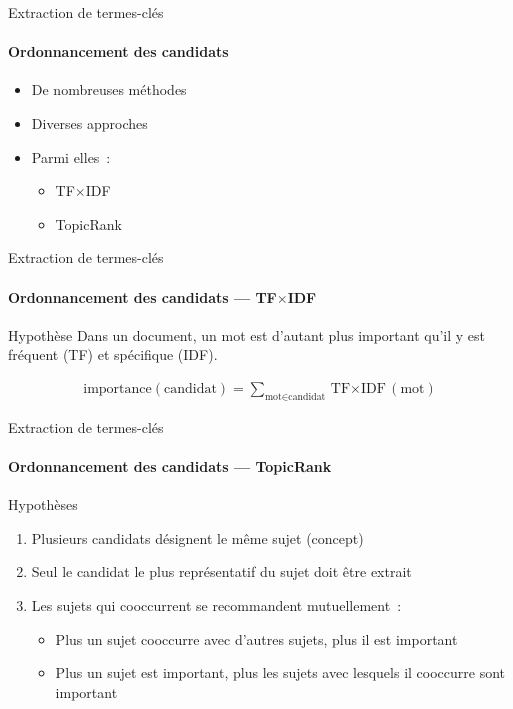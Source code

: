   \begin{frame}{Extraction de termes-clés}
    \framesubtitle{Ordonnancement des candidats}

    \begin{itemize}
      \item{De nombreuses méthodes}
      \item{Diverses approches}
      \item{Parmi elles~:}
      \begin{itemize}
        \item{TF$\times$IDF}
        \item{TopicRank~\cite{bougouin2013topicrank}}
      \end{itemize}
    \end{itemize}
  \end{frame}

  \begin{frame}{Extraction de termes-clés}
    \framesubtitle{Ordonnancement des candidats --- TF$\times$IDF}

    \begin{block}{Hypothèse}
      Dans un document, un mot est d'autant plus important qu'il  y est fréquent
      (TF) et spécifique (IDF).
    \end{block}

    \begin{align*}
      \text{importance}(\text{candidat}) = \sum_{\text{mot} \in \text{candidat}} \text{TF$\times$IDF}(\text{mot})
    \end{align*}
  \end{frame}

  \begin{frame}{Extraction de termes-clés}
    \framesubtitle{Ordonnancement des candidats --- TopicRank}

    \begin{block}{Hypothèses}
      \begin{enumerate}
        \item{Plusieurs candidats désignent le même sujet (concept)}
        \item{Seul le candidat le plus représentatif du sujet doit être extrait}
        \item{Les sujets qui cooccurrent se recommandent mutuellement~:}
        \begin{itemize}
          \item{Plus un sujet cooccurre avec d'autres sujets, plus il est
                important}
          \item{Plus un sujet est important, plus les sujets avec lesquels il
                cooccurre sont important}
        \end{itemize}
      \end{enumerate}
    \end{block}
  \end{frame}

